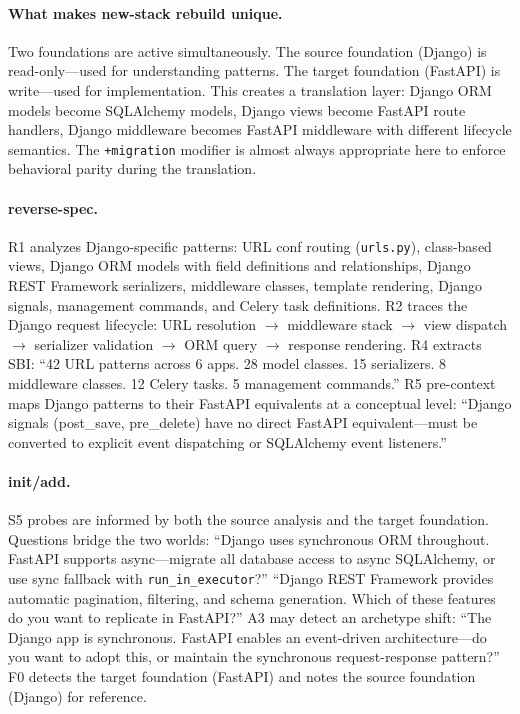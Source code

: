 \documentclass[11pt,a4paper,openright,twoside]{report}
\begin{document}
\paragraph{What makes new-stack rebuild unique.}
Two foundations are active simultaneously. The source foundation (Django) is read-only---used for understanding patterns. The target foundation (FastAPI) is write---used for implementation. This creates a translation layer: Django ORM models become SQLAlchemy models, Django views become FastAPI route handlers, Django middleware becomes FastAPI middleware with different lifecycle semantics. The \texttt{+migration} modifier is almost always appropriate here to enforce behavioral parity during the translation.

\paragraph{reverse-spec.}
R1 analyzes Django-specific patterns: URL conf routing (\texttt{urls.py}), class-based views, Django ORM models with field definitions and relationships, Django REST Framework serializers, middleware classes, template rendering, Django signals, management commands, and Celery task definitions. R2 traces the Django request lifecycle: URL resolution $\to$ middleware stack $\to$ view dispatch $\to$ serializer validation $\to$ ORM query $\to$ response rendering. R4 extracts SBI: ``42 URL patterns across 6 apps. 28 model classes. 15 serializers. 8 middleware classes. 12 Celery tasks. 5 management commands.'' R5 pre-context maps Django patterns to their FastAPI equivalents at a conceptual level: ``Django signals (post\_save, pre\_delete) have no direct FastAPI equivalent---must be converted to explicit event dispatching or SQLAlchemy event listeners.''

\paragraph{init/add.}
S5 probes are informed by both the source analysis and the target foundation. Questions bridge the two worlds: ``Django uses synchronous ORM throughout. FastAPI supports async---migrate all database access to async SQLAlchemy, or use sync fallback with \texttt{run\_in\_executor}?'' ``Django REST Framework provides automatic pagination, filtering, and schema generation. Which of these features do you want to replicate in FastAPI?'' A3 may detect an archetype shift: ``The Django app is synchronous. FastAPI enables an event-driven architecture---do you want to adopt this, or maintain the synchronous request-response pattern?'' F0 detects the target foundation (FastAPI) and notes the source foundation (Django) for reference.
\end{document}
